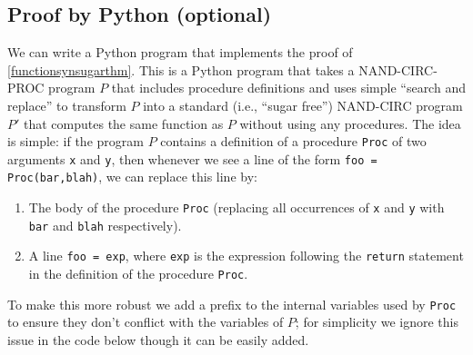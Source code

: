 \hypertarget{countinglines}{}

\subsection{Proof by Python (optional)}\label{functionsynsugarthmpython}

We can write a Python program that implements the proof of
\cref{functionsynsugarthm}. This is a Python program that takes a
NAND-CIRC-PROC program \(P\) that includes procedure definitions and
uses simple ``search and replace'' to transform \(P\) into a standard
(i.e., ``sugar free'') NAND-CIRC program \(P'\) that computes the same
function as \(P\) without using any procedures. The idea is simple: if
the program \(P\) contains a definition of a procedure \texttt{Proc} of
two arguments \texttt{x} and \texttt{y}, then whenever we see a line of
the form \texttt{foo = Proc(bar,blah)}, we can replace this line by:

\begin{enumerate}
\def\labelenumi{\arabic{enumi}.}
\item
  The body of the procedure \texttt{Proc} (replacing all occurrences of
  \texttt{x} and \texttt{y} with \texttt{bar} and \texttt{blah}
  respectively).
\item
  A line \texttt{foo = exp}, where \texttt{exp} is the expression
  following the \texttt{return} statement in the definition of the
  procedure \texttt{Proc}.
\end{enumerate}

To make this more robust we add a prefix to the internal variables used
by \texttt{Proc} to ensure they don't conflict with the variables of
\(P\); for simplicity we ignore this issue in the code below though it
can be easily added.

